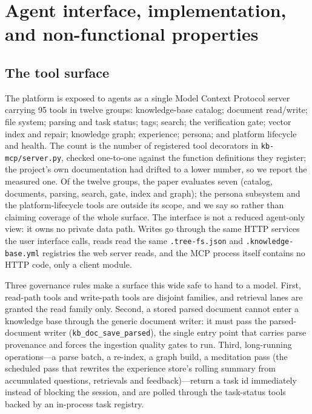\section{Agent interface, implementation, and non-functional properties}
\label{sec:implementation}
\label{sec:impl}

\subsection{The tool surface}
\label{sec:impl-tools}

The platform is exposed to agents as a single Model Context Protocol
server~\cite{mcp} carrying 95 tools in twelve groups: knowledge-base catalog;
document read/write; file system; parsing and task status; tags; search; the
verification gate; vector index and repair; knowledge graph; experience;
persona; and platform lifecycle and health. The count is the number of registered tool decorators in
\texttt{kb-mcp/server.py}, checked one-to-one against the function
definitions they register; the project's own documentation had drifted to a
lower number, so we report the measured one. Of the twelve groups, the paper
evaluates seven (catalog, documents, parsing, search, gate, index and graph);
the persona subsystem and the platform-lifecycle tools are outside its scope,
and we say so rather than claiming coverage of the whole surface. The interface is not a reduced
agent-only view: it owns no private data path. Writes go through the same
HTTP services the user interface calls, reads read the same
\texttt{.tree-fs.json} and \texttt{.knowledge-base.yml} registries the web
server reads, and the MCP process itself contains no HTTP code, only a
client module.

Three governance rules make a surface this wide safe to hand to a model.
First, read-path tools and write-path tools are disjoint families, and
retrieval lanes are granted the read family only. Second, a stored parsed
document cannot enter a knowledge base through the generic document writer:
it must pass the parsed-document writer (\texttt{kb\_doc\_save\_parsed}),
the single entry point that carries parse provenance and forces the
ingestion quality gates to run. Third, long-running operations---a parse
batch, a re-index, a graph build, a meditation pass (the scheduled pass that
rewrites the experience store's rolling summary from accumulated questions,
retrievals and feedback)---return a task id
immediately instead of blocking the session, and are polled through the
task-status tools backed by an in-process task registry.


